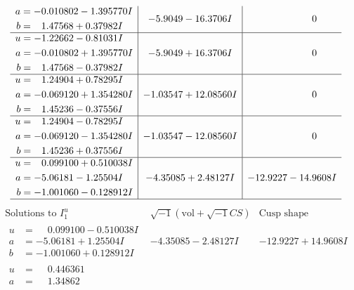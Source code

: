 \documentclass[1p]{elsarticle_modified}
\theoremstyle{definition}
\newcommand{\I}{\sqrt{-1}}
\begin{document}
$$\begin{array}{c|c|c}
\begin{aligned}
a &= -0.010802 - 1.395770 I \\
b &= \phantom{-}1.47568 + 0.37982 I\end{aligned}
 & -5.9049 - 16.3706 I & \phantom{-0.000000 } 0 \\ \hline\begin{aligned}
u &= -1.22662 - 0.81031 I \\
a &= -0.010802 + 1.395770 I \\
b &= \phantom{-}1.47568 - 0.37982 I\end{aligned}
 & -5.9049 + 16.3706 I & \phantom{-0.000000 } 0 \\ \hline\begin{aligned}
u &= \phantom{-}1.24904 + 0.78295 I \\
a &= -0.069120 + 1.354280 I \\
b &= \phantom{-}1.45236 - 0.37556 I\end{aligned}
 & -1.03547 + 12.08560 I & \phantom{-0.000000 } 0 \\ \hline\begin{aligned}
u &= \phantom{-}1.24904 - 0.78295 I \\
a &= -0.069120 - 1.354280 I \\
b &= \phantom{-}1.45236 + 0.37556 I\end{aligned}
 & -1.03547 - 12.08560 I & \phantom{-0.000000 } 0 \\ \hline\begin{aligned}
u &= \phantom{-}0.099100 + 0.510038 I \\
a &= -5.06181 - 1.25504 I \\
b &= -1.001060 - 0.128912 I\end{aligned}
 & -4.35085 + 2.48127 I & -12.9227 - 14.9608 I\\
 \hline 
 \end{array}$$\newpage$$\begin{array}{c|c|c}  
\text{Solutions to }I^u_{1}& \I (\text{vol} + \sqrt{-1}CS) & \text{Cusp shape}\\
 \hline 
\begin{aligned}
u &= \phantom{-}0.099100 - 0.510038 I \\
a &= -5.06181 + 1.25504 I \\
b &= -1.001060 + 0.128912 I\end{aligned}
 & -4.35085 - 2.48127 I & -12.9227 + 14.9608 I \\ \hline\begin{aligned}
u &= \phantom{-}0.446361\phantom{ +0.000000I} \\
a &= \phantom{-}1.34862\phantom{ +0.000000I} \\

\end{aligned}
\end{array}$$
\end{document}
